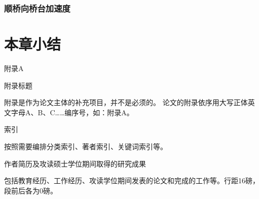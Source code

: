 \documentclass{bjtuthesis}
\begin{document}
\subsubsection{顺桥向桥台加速度}

\section{本章小结}


\cleardoublepage 
\begin{center}
{\heiti 附录A}
\end{center}
\begin{center}
{\heiti 附录标题}
\end{center}

\indent{}附录是作为论文主体的补充项目，并不是必须的。
论文的附录依序用大写正体英文字母A、B、C……编序号，如：附录A。
\cleardoublepage
\begin{center}
{\heiti 索引}
\end{center}

\indent{}按照需要编排分类索引、著者索引、关键词索引等。
\cleardoublepage
\begin{thecenter}
作者简历及攻读硕士学位期间取得的研究成果
\end{thecenter}

包括教育经历、工作经历、攻读学位期间发表的论文和完成的工作等。行距16磅，段前后各为0磅。
\cleardoublepage
\cstatement
\clastpage
\end{document}
